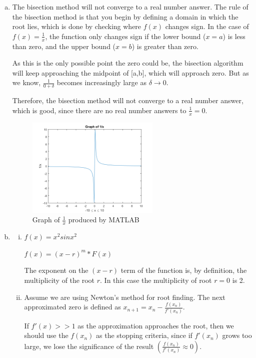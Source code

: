 \documentclass[11pt]{article}
\begin{document}
\begin{enumerate}
\begin{enumerate}[(a)]
		\item The bisection method will not converge to a real number answer. The rule of the bisection method is that you begin by
		defining a domain in which the root lies, which is done by checking where $f(x)$ changes sign. In the case of
		$f(x) = \frac{1}{x} $, the function only changes sign if the lower bound ($x=a$) is less than zero, and the upper bound
		($x=b$) is greater than zero.

		As this is the only possible point the zero could be, the bisection algorithm will keep approaching the midpoint of
		[a,b], which will approach zero. But as we know,
		$\frac{1}{0+\delta}$ becomes increasingly large as $\delta \to 0$.

		Therefore, the bisection method will not converge to a real number answer, which is good, since there are no real number
		answers to $\frac{1}{x} = 0$. \\

		\begin{figure}[H]
			\centering
			\includegraphics[width=0.6\textwidth]{q1i.png}
			\caption{Graph of $\frac{1}{x}$ produced by MATLAB}
		\end{figure}

		\item
		\begin{enumerate}[i.]
		\item $f(x) = x^2sinx^2$

		$f(x) = (x-r)^m*F(x)$

		The exponent on the $(x-r)$ term of the function is, by definition, the multiplicity of the root $r$. In this case
		the multiplicity of root $r = 0$ is 2.

		\item Assume we are using Newton's method for root finding. The next approximated zero is defined as $x_{n+1} =
			x_n - \frac{f(x_n)}{f'(x_n)}$.

			If $f'(x) >> 1$ as the approximation approaches the root, then we should
			use the $f(x_n)$ as the stopping criteria, since if $f'(x_n)$ grows too large, we lose the significance of the
			result $(\frac{f(x_n)}{f'(x_n)} \approx 0)$.


\end{enumerate}
\end{enumerate}
\end{enumerate}
\end{document}
